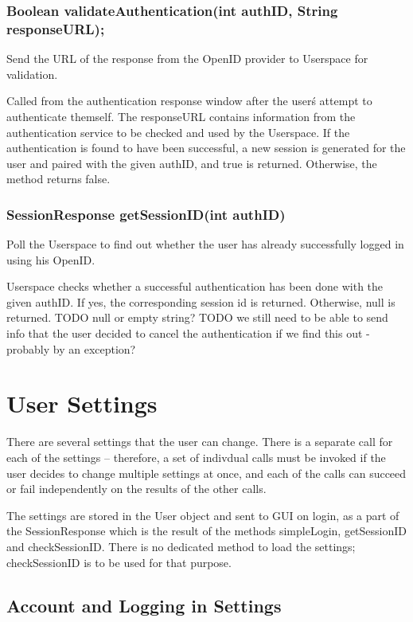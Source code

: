 \subsubsection{Boolean validateAuthentication(int authID, String responseURL);}
Send the URL of the response from the OpenID provider to Userspace for validation.

Called from the authentication response window after the user\'s attempt to authenticate themself.
The responseURL contains information from the authentication service to be checked and used by the Userspace.
If the authentication is found to have been successful, a new session is generated for the user and paired with the given authID, and true is returned.
Otherwise, the method returns false.

\subsubsection{SessionResponse getSessionID(int authID)}
Poll the Userspace to find out whether the user has already successfully logged in using his OpenID.

Userspace checks whether a successful authentication has been done with the given authID.
If yes, the corresponding session id is returned.
Otherwise, null is returned.
TODO null or empty string?
TODO we still need to be able to send info that the user decided to cancel the authentication if we find this out - probably by an exception?

\section{User Settings}

There are several settings that the user can change. There is a separate call for each of the settings -- therefore, a set of indivdual calls must be invoked if the user decides to change multiple settings at once, and each of the calls can succeed or fail independently on the results of the other calls.

The settings are stored in the User object and sent to GUI on login, as a part of the SessionResponse which is the result of the methods simpleLogin, getSessionID and checkSessionID. There is no dedicated method to load the settings; checkSessionID is to be used for that purpose.

\subsection{Account and Logging in Settings}

